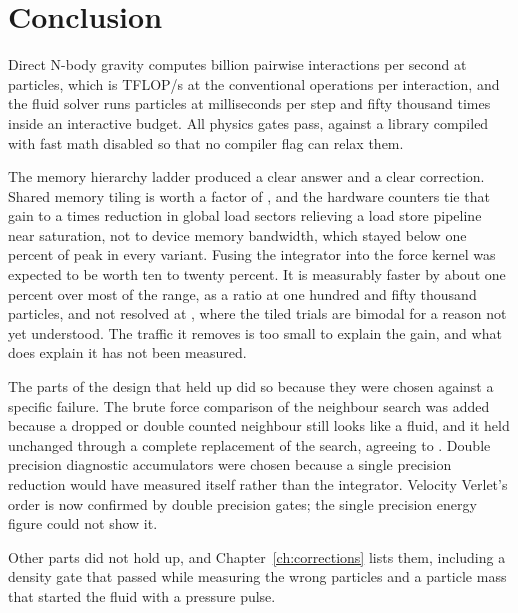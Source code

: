 \chapter{Conclusion}
\label{ch:conclusion}

Direct N-body gravity computes \TiledGigaInteractionsAtMaxN{} billion pairwise
interactions per second at \LadderMaxN{} particles, which is \TiledTflopsAtMaxN{} TFLOP/s
at the conventional \ConventionalFlopsPerInteraction{} operations per interaction, and the
fluid solver runs \SphMaxN{} particles at \SphMsAtMaxN{} milliseconds per step and fifty
thousand \SphInteractiveMargin{} times inside an interactive budget. All \GateCount{}
physics gates pass, against a library compiled with fast math disabled so that no
compiler flag can relax them.

The memory hierarchy ladder produced a clear answer and a clear correction. Shared memory
tiling is worth a factor of \TilingSpeedupAtMaxN{}, and the hardware counters tie that gain
to a \SectorReduction{} times reduction in global load sectors relieving a load store
pipeline near saturation, not to device memory bandwidth, which stayed below one percent of
peak in every variant. Fusing the integrator into the force kernel was expected to be worth
ten to twenty percent. It is measurably faster by about one percent over most of the range,
\FusedOverTiledRatioAtHundredFiftyThousand{} as a ratio at one hundred and fifty thousand
particles, and not resolved at \LadderMaxN{}, where the tiled trials are bimodal for a
reason not yet understood. The traffic it removes is too small to explain the gain, and
what does explain it has not been measured.

The parts of the design that held up did so because they were chosen against a specific
failure. The brute force comparison of the neighbour search was added because a dropped or
double counted neighbour still looks like a fluid, and it held unchanged through a
complete replacement of the search, agreeing to \NeighbourSearchError{}. Double precision diagnostic
accumulators were chosen because a single precision reduction would have measured itself
rather than the integrator. Velocity Verlet's order is now confirmed by double precision
gates; the single precision energy figure could not show it.

Other parts did not hold up, and Chapter~\ref{ch:corrections} lists them, including a
density gate that passed while measuring the wrong particles and a particle mass that
started the fluid with a pressure pulse.

